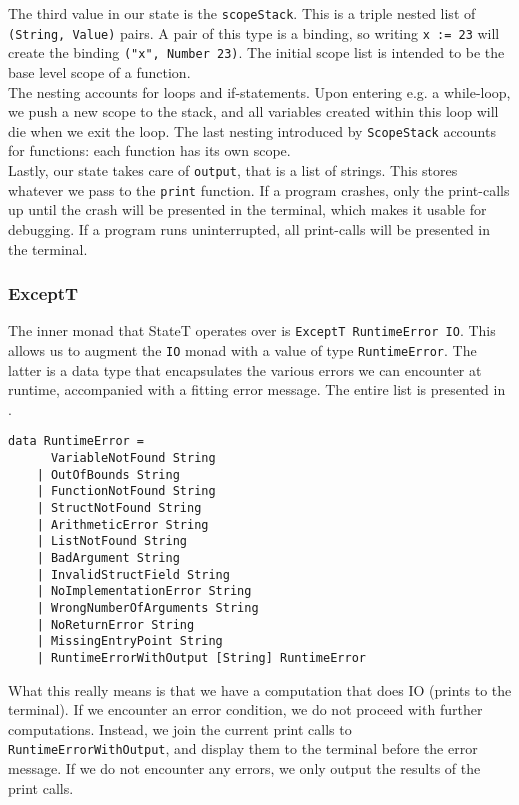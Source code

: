 The third value in our state is the \texttt{scopeStack}. This is a triple nested list of \texttt{(String, Value)} pairs. A pair of this type is a binding, so writing \texttt{x := 23} will create the binding \texttt{("x", Number 23)}. The initial scope list is intended to be the base level scope of a function. \\

The nesting accounts for loops and if-statements. Upon entering e.g. a while-loop, we push a new scope to the stack, and all variables created within this loop will die when we exit the loop. The last nesting introduced by \texttt{ScopeStack} accounts for functions: each function has its own scope. \\

Lastly, our state takes care of \texttt{output}, that is a list of strings. This stores whatever we pass to the \texttt{print} function. If a program crashes, only the print-calls up until the crash will be presented in the terminal, which makes it usable for debugging. If a program runs uninterrupted, all print-calls will be presented in the terminal.

\subsubsection{ExceptT}

The inner monad that StateT operates over is \texttt{ExceptT RuntimeError IO}. This allows us to augment the \texttt{IO} monad with a value of type \texttt{RuntimeError}. The latter is a data type that encapsulates the various errors we can encounter at runtime, accompanied with a fitting error message. The entire list is presented in . \\

\begin{lstlisting}[caption={All error messages we can encounter in Psnodig.}, captionpos=b, label={psnodigErrorMsgs}]
data RuntimeError =
      VariableNotFound String
    | OutOfBounds String
    | FunctionNotFound String
    | StructNotFound String
    | ArithmeticError String
    | ListNotFound String
    | BadArgument String
    | InvalidStructField String
    | NoImplementationError String
    | WrongNumberOfArguments String
    | NoReturnError String
    | MissingEntryPoint String
    | RuntimeErrorWithOutput [String] RuntimeError
\end{lstlisting}

What this really means is that we have a computation that does IO (prints to the terminal). If we encounter an error condition, we do not proceed with further computations. Instead, we join the current print calls to \texttt{RuntimeErrorWithOutput}, and display them to the terminal before the error message. If we do not encounter any errors, we only output the results of the print calls.

